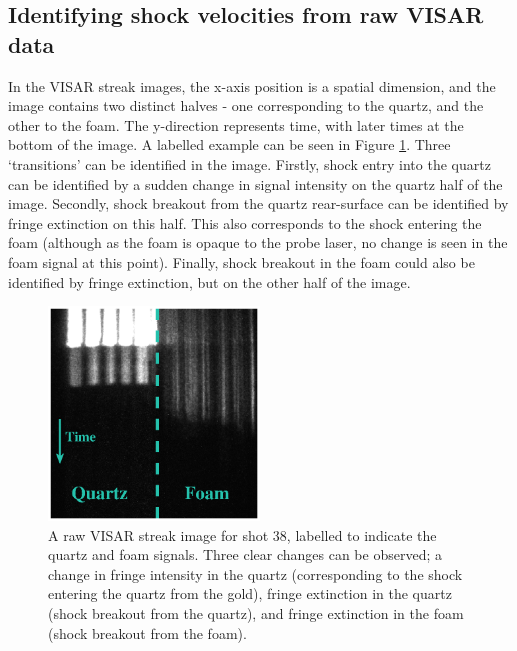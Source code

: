 \subsection{Identifying shock velocities from raw VISAR data}

In the VISAR streak images, the x-axis position is a spatial dimension, and the image contains two distinct halves - one corresponding to the quartz, and the other to the foam. The y-direction represents time, with later times at the bottom of the image. A labelled example can be seen in Figure \ref{fig:VISARImage}. Three `transitions' can be identified in the image. Firstly, shock entry into the quartz can be identified by a sudden change in signal intensity on the quartz half of the image. Secondly, shock breakout from the quartz rear-surface can be identified by fringe extinction on this half. This also corresponds to the shock entering the foam (although as the foam is opaque to the probe laser, no change is seen in the foam signal at this point). Finally, shock breakout in the foam could also be identified by fringe extinction, but on the other half of the image.

\begin{figure} [h]
\begin{centering}
\includegraphics[width=0.5\textwidth]{figures/Experiment/VISARImage.eps}%
\caption{\label{fig:VISARImage} A raw VISAR streak image for shot 38, labelled to indicate the quartz and foam signals. Three clear changes can be observed; a change in fringe intensity in the quartz (corresponding to the shock entering the quartz from the gold), fringe extinction in the quartz (shock breakout from the quartz), and fringe extinction in the foam (shock breakout from the foam). }
\end{centering}
\end{figure}

